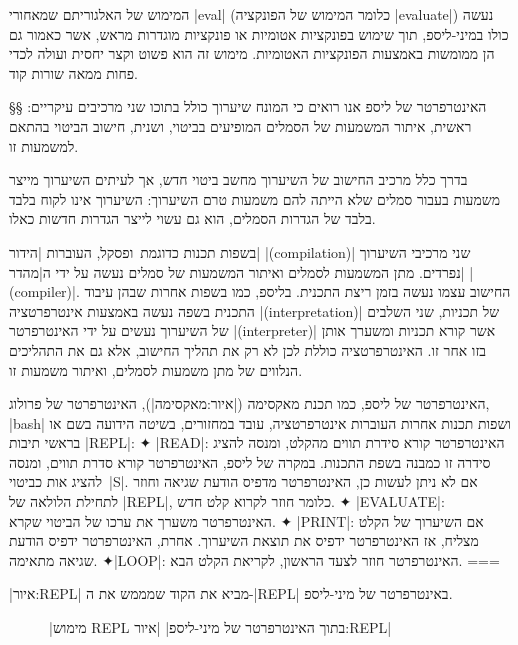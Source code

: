 המימוש של האלגוריתם שמאחורי \E|eval| (כלומר המימוש של הפונקציה \E|evaluate|)
נעשה כולו במיני-ליספ, תוך שימוש בפונקציות אטומיות או פונקציות מוגדרות מראש, אשר
כאמור גם הן ממומשות באמצעות הפונקציות האטומיות. מימוש זה הוא פשוט וקצר יחסית
ועולה לכדי פחות ממאה שורות קוד.

§§ האינטרפרטר של ליספ
אנו רואים כי המונח שיערוך כולל בתוכו שני מרכיבים עיקריים: ראשית, איתור המשמעות
של הסמלים המופיעים בביטוי, ושנית, חישוב הביטוי בהתאם למשמעות זו.

בדרך כלל מרכיב החישוב של השיערוך מחשב ביטוי חדש, אך לעיתים השיערוך מייצר משמעות
בעבור סמלים שלא הייתה להם משמעות טרם השיערוך: השיערוך אינו לקוח בלבד
בלבד של הגדרות הסמלים, הוא גם עשוי לייצר הגדרות חדשות כאלו.

בשפות תכנות כדוגמת~\CPL ופסקל, העוברות \ע|הידור| \E|(compilation)| שני מרכיבי
השיערוך נפרדים. מתן המשמעות לסמלים ואיתור המשמעות של סמלים נעשה על ידי
ה\ע|מהדר| \E|(compiler)|. החישוב עצמו נעשה בזמן ריצת התכנית. בליספ, כמו בשפות
אחרות שבהן עיבוד התכנית בשפה נעשה באמצעות אינטרפרטציה \E|(interpretation)| של
תכניות, שני השלבים של השיערוך נעשים על ידי האינטרפרטר \E|(interpreter)| אשר
קורא תכניות ומשערך אותן בזו אחר זו. האינטרפרטציה כוללת לכן לא רק את תהליך
החישוב, אלא גם את התהליכים הנלווים של מתן משמעות לסמלים, ואיתור משמעות זו.

\begin{minipage}{0.9\linewidth}
  \centering
  \footnotesize
\begin{mdframed}[backgroundcolor=Lavender!20]
    האינטרפרטר של ליספ, כמו תכנת מאקסימה (|איור:מאקסימה|), האינטרפרטר של
    פרולוג, \E|bash| ושפות תכנות אחרות העוברות אינטרפרטציה, עובד במחזורים,
    בשיטה הידועה בשם
    או בראשי תיבות \E|REPL|:
    ✦ \E|READ|: האינטרפרטר קורא סידרת תווים מהקלט, ומנסה להציג סידרה זו כמבנה
    בשפת התכנות. במקרה של ליספ, האינטרפרטר קורא סדרת תווים, ומנסה להציג
    אות כביטוי~\E|S|. אם לא ניתן לעשות כן, האינטרפרטר מדפיס הודעת שגיאה וחוזר
    לתחילת הלולאה של \E|REPL|, כלומר חוזר לקרוא קלט חדש.
    ✦ \E|EVALUATE|: האינטרפרטר משערך את ערכו של הביטוי שקרא.
    ✦ \E|PRINT|: אם השיערוך של הקלט מצליח, אז האינטרפרטר ידפיס את תוצאת
    השיערוך. אחרת, האינטרפרטר ידפיס הודעת שגיאה מתאימה.
    ✦\E|LOOP|: האינטרפרטר חוזר לצעד הראשון, לקריאת הקלט הבא.
===
  \end{mdframed}
\end{minipage}

|איור:REPL| מביא את הקוד שמממש את ה-\E|REPL| באינטרפרטר של מיני-ליספ.
\begin{figure}
|מימוש REPL בתוך האינטרפרטר של מיני-ליספ|
|איור:REPL|
\begin{LTR}
  \def\codesize{\small}
  
\end{LTR}
\end{figure}


